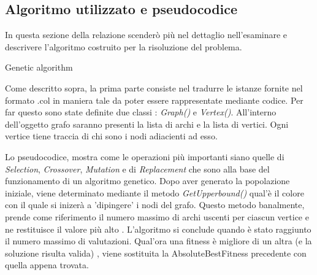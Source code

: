 \documentclass{article}
\begin{document}
\begin{enumerate}
\section{Algoritmo utilizzato e pseudocodice}
In questa sezione della relazione scenderò più nel dettaglio nell'esaminare e descrivere l'algoritmo costruito per la risoluzione del problema.

\begin{algorithm}
\caption{Genetic algorithm}\label{alg:cap}
\begin{algorithmic} 

            \EndIf
\end{algorithmic}
\end{algorithm}



\noindent Come descritto  sopra, la prima parte consiste nel tradurre le istanze fornite nel formato .col in maniera tale da poter essere rappresentate mediante codice. Per far questo sono state definite due classi : \textit{Graph()} e \textit{Vertex()}. All'interno dell'oggetto grafo saranno presenti la lista di archi e la lista di vertici. Ogni vertice tiene traccia di chi sono i nodi adiacienti ad esso.


\noindent Lo pseudocodice, mostra come le operazioni più importanti siano quelle di \textit{Selection}, \textit{Crossover}, \textit{Mutation} e di \textit{Replacement} che sono alla base del funzionamento di un algoritmo genetico. Dopo aver generato la popolazione iniziale, viene determinato mediante il metodo \textit{GetUpperbound()} qual'è il colore con il quale si inizerà a 'dipingere' i nodi del grafo. Questo metodo banalmente, prende come riferimento il numero massimo di archi uscenti per ciascun vertice e ne restituisce il valore più alto . L'algoritmo si conclude quando è stato raggiunto il numero massimo di valutazioni. Qual'ora una fitness è migliore di un altra (e la soluzione risulta valida) , viene sostituita la AbsoluteBestFitness precedente con quella appena trovata.


\end{enumerate}
\end{document}
